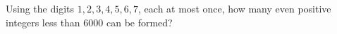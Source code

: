 Using the digits $1,2,3,4,5,6,7$, each at most once, how many even positive integers less than $6000$ can be formed?

